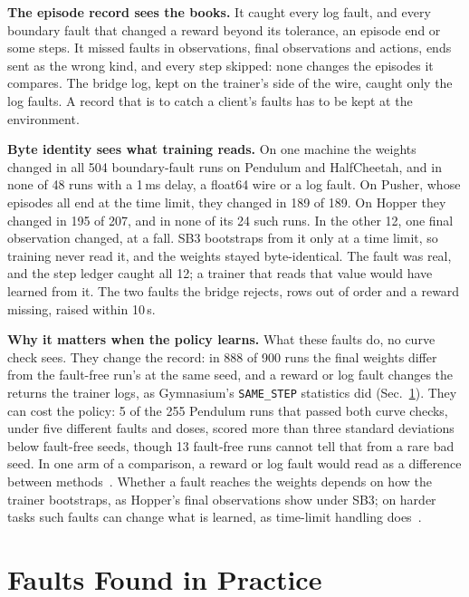 \documentclass[conference]{IEEEtran}
\begin{document}
\textbf{The episode record sees the books.} It caught every log fault, and
every boundary fault that changed a reward beyond its tolerance, an episode
end or some steps. It missed faults in observations, final observations and
actions, ends sent as the wrong kind, and every step skipped: none changes
the episodes it compares. The bridge log, kept on the trainer's
side of the wire, caught only the log faults. A record that is to catch a
client's faults has to be kept at the environment.

\textbf{Byte identity sees what training reads.} On one machine the
weights changed in all 504 boundary-fault runs on Pendulum and HalfCheetah,
and in none of 48 runs with a 1\,ms delay, a float64 wire or a log fault.
On Pusher, whose episodes all end at the time limit, they changed in 189 of
189. On Hopper they changed in 195 of 207, and in none of its 24 such runs.
In the other 12,
one final observation changed, at a fall. SB3 bootstraps from it only at a
time limit, so training never read it, and the weights stayed
byte-identical. The fault was real, and the step ledger caught all 12; a
trainer that reads that value would have learned from it. The two faults
the bridge rejects, rows out of order and a reward missing, raised within
10\,s.

\textbf{Why it matters when the policy learns.} What these faults do, no
curve check sees. They change the record: in 888 of 900 runs the final
weights differ from the fault-free run's at the same seed, and a reward or
log fault changes the returns the trainer logs, as Gymnasium's
\texttt{SAME\_STEP} statistics did (Sec.~\ref{sec:wild}). They can cost the
policy: 5 of the 255 Pendulum runs that passed both curve checks, under
five different faults and doses, scored more than three standard
deviations below fault-free seeds, though 13 fault-free runs cannot tell
that from a rare bad seed. In one arm of a comparison, a reward or
log fault would read as a difference between
methods~\cite{henderson2018matters}. Whether a fault reaches the weights
depends on how the trainer bootstraps, as Hopper's final observations show
under SB3; on harder tasks
such faults can change what is learned, as time-limit handling
does~\cite{pardo2018time}.

\section{Faults Found in Practice}
\label{sec:wild}\label{sec:silent}
\end{document}
